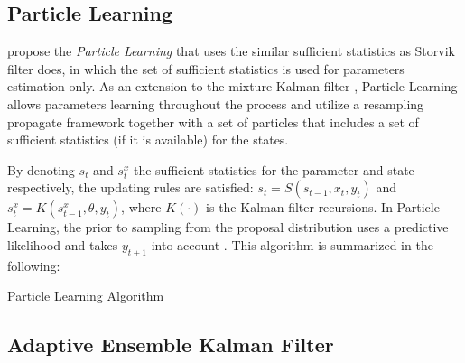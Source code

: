 \subsection{Particle Learning}

\cite{carvalho2010particle} propose the  \textit{Particle Learning} that uses the similar sufficient statistics as Storvik filter does, in which the set of sufficient statistics is used for parameters estimation only. As an extension to the mixture Kalman filter \citep{chen2000mixture}, Particle Learning allows parameters learning throughout the process and utilize a resampling propagate framework together with a set of particles that includes a set of sufficient statistics (if it is available) for the states. 

By denoting $s_t$ and $s_t^x$ the sufficient statistics for the parameter and state respectively, the updating rules are satisfied: $s_t=S(s_{t-1},x_t,y_t)$ and $s_t^x=K\left(s_{t-1}^x,\theta,y_t\right)$, where $K(\cdot)$ is the Kalman filter recursions. In Particle Learning, the prior to sampling from the proposal distribution uses a predictive likelihood and takes $y_{t+1}$ into account \citep{vieira2016online}. This algorithm is summarized in the following: 
\begin{algorithm}[h]
\SetAlgoLined 
\caption{Particle Learning Algorithm}\label{algorithmPL}
\end{algorithm}

\subsection{Adaptive Ensemble Kalman Filter}

